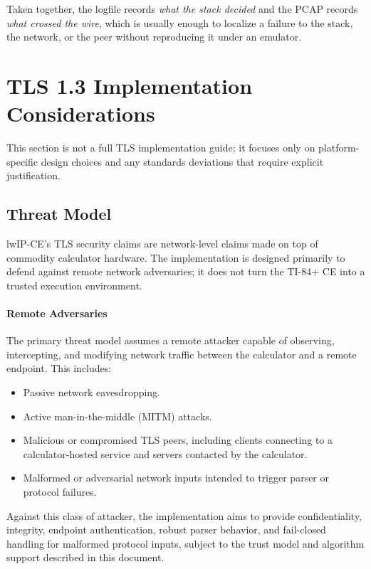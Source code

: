 \documentclass[titlepage]{report}
\begin{document}
		Taken together, the logfile records \emph{what the stack decided} and the PCAP records \emph{what crossed the wire}, which is usually enough to localize a failure to the stack, the network, or the peer without reproducing it under an emulator.

		\newpage
		\section{TLS 1.3 Implementation Considerations}
	
	This section is not a full TLS implementation guide; it focuses only on platform-specific design choices and any standards deviations that require explicit justification.
	
	\subsection{Threat Model}
	
	lwIP-CE's TLS security claims are network-level claims made on top of commodity calculator hardware. The implementation is designed primarily to defend against remote network adversaries; it does not turn the TI-84+ CE into a trusted execution environment.
	
	\paragraph{Remote Adversaries}
	
	The primary threat model assumes a remote attacker capable of observing, intercepting, and modifying network traffic between the calculator and a remote endpoint. This includes:
	
	\begin{itemize}
		\item Passive network eavesdropping.
		\item Active man-in-the-middle (MITM) attacks.
		\item Malicious or compromised TLS peers, including clients connecting to a calculator-hosted service and servers contacted by the calculator.
		\item Malformed or adversarial network inputs intended to trigger parser or protocol failures.
	\end{itemize}
	
	Against this class of attacker, the implementation aims to provide confidentiality, integrity, endpoint authentication, robust parser behavior, and fail-closed handling for malformed protocol inputs, subject to the trust model and algorithm support described in this document.
	
\end{document}
